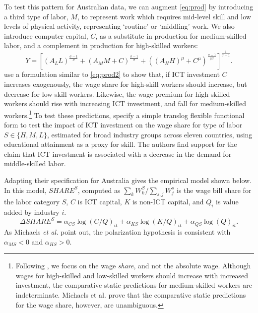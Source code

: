 \documentclass[a4paper,11pt,notitlepage]{article}
\begin{document}
To test this pattern for Australian data, we can augment \eqref{eq:prod} by introducing a third type of labor, $M$, to represent work which requires mid-level skill and low levels of physical activity, representing `routine' or `middling' work. We also introduce computer capital, $C$, as a substitute in production for medium-skilled labor, and a complement in production for high-skilled workers:
\begin{equation}  \label{eq:prod2}
Y = \left[
  \left(A_LL \right)^\frac{\sigma-1}{\sigma}
  +
  \left(A_MM + C\right)^\frac{\sigma-1}{\sigma}
  +
  \left((A_HH)^\mu + C^\mu\right)^\frac{\sigma-1}{\mu\sigma}
  \right]^\frac{1}{\sigma-1}.
\end{equation}
\citet{Michaels2010} use a formulation similar to \eqref{eq:prod2} to show that, if ICT investment $C$ increases exogenously, the wage share for high-skill workers should increase, but decrease for low-skill workers. Likewise, the wage premium for high-skilled workers should rise with increasing ICT investment, and fall for medium-skilled workers.\footnote{Following \citet{Michaels2010}, we focus on the wage {\em share}, and not the absolute wage. Although wages for high-skilled and low-skilled workers should increase with increased investment, the comparative static predictions for medium-skilled workers are indeterminate. Michaels et al. prove that the comparative static predictions for the wage share, however, are unambiguous.} To test these predictions, \citet{Michaels2010} specify a simple translog flexible functional form to test the impact of ICT investment on the wage share for type of labor $S\in\{H,M,L\}$, estimated for broad industry groups across eleven countries, using educational attainment as a proxy for skill. The authors find support for the claim that ICT investment is associated with a decrease in the demand for middle-skilled labor. 

Adapting their specification for Australia gives the empirical model shown below. In this model, $SHARE^S$, computed as ${\sum_k W^S_k/\sum_{s,j}W^s_j}$ is the wage bill share for the labor category $S$, $C$ is ICT capital, $K$ is non-ICT capital, and $Q_i$ is value added by industry $i$. 
\begin{equation} \label{eq:translog}
\Delta SHARE^S = \alpha_{CS}\log(C/Q)_{it} + \alpha_{KS}\log(K/Q)_{it} + \alpha_{QS}\log(Q)_{it}.
\end{equation}
As Michaels {\it et al.} point out, the polarization hypothesis is consistent with $\alpha_{MS}<0$ and $\alpha_{HS}>0$.
\end{document}

